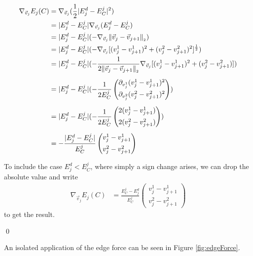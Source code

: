 \begin{proposition}
	\begin{align*}
		\nabla_{\vec{v}_{j}} E_{j}(C) &= \nabla_{\vec{v}_j} (\frac{1}{2} |E_j^d - E^j_C|^2) \\
		&= |E_j^d - E^j_C| \nabla_{\vec{v}_j} (E_j^d - E^j_C) \\
		&= |E_j^d - E^j_C| (- \nabla_{\vec{v}_j} \norm[\vec{v}_j - \vec{v}_{j+1}] ) \\
		&= |E_j^d - E^j_C| (- \nabla_{\vec{v}_j} [(v_j^1 - v_{j+1}^1)^2 + (v_j^2 - v_{j+1}^2)^2]^{\frac{1}{2}} ) \\
		&= |E_j^d - E^j_C| (- \frac{1}{2 \norm[\vec{v}_j - \vec{v}_{j+1}]} \nabla_{\vec{v}_j} [(v_j^1 - v_{j+1}^1)^2 + (v_j^2 - v_{j+1}^2)]) \\[0.5em] 
		&= |E_j^d - E^j_C| (- \frac{1}{2 E^j_C} \begin{pmatrix}
			\partial_{v_j^1} (v_j^1 - v_{j+1}^1)^2 \\[0.5em]
			\partial_{v_j^2} (v_j^2 - v_{j+1}^2)^2
		\end{pmatrix}) \\[0.5em]
		&= |E_j^d - E^j_C| (- \frac{1}{2 E^j_C} \begin{pmatrix}
			 2(v_j^1 - v_{j+1}^1) \\[0.5em]
			 2(v_j^2 - v_{j+1}^2)
		\end{pmatrix}) \\[0.5em] 
		&= - \frac{|E_j^d - E^j_C|}{E^j_C} \begin{pmatrix}
			v_j^1 - v_{j+1}^1 \\[0.5em]
			v_j^2 - v_{j+1}^2
	   \end{pmatrix} 
	\end{align*}

	To include the case $E_j^d < E^j_C$, where simply a sign change arises, we can drop the absolute value and write 
	\begin{align*}
		\nabla_{\vec{v}_j} E_{j}(C) &= \frac{E^j_C - E_j^d}{E^j_C} \begin{pmatrix}
			v_j^1 - v_{j+1}^1 \\[0.5em]
			v_j^2 - v_{j+1}^2
	   \end{pmatrix} 
	\end{align*}
	to get the result.

	\qed  
\end{proposition}

An isolated application of the edge force can be seen in Figure \ref{fig:edgeForce}.  

